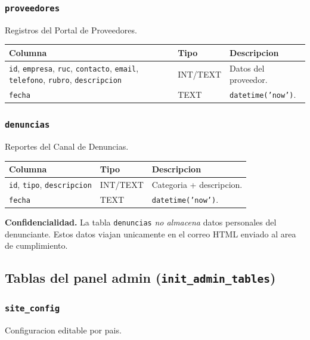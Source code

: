 \documentclass[11pt,a4paper]{article}
\begin{document}
\subsubsection{\texttt{proveedores}}
Registros del Portal de Proveedores.

\begin{longtable}{p{3cm} p{2cm} p{9cm}}
\toprule
\textbf{Columna} & \textbf{Tipo} & \textbf{Descripcion} \\
\midrule
\endhead
\texttt{id}, \texttt{empresa}, \texttt{ruc}, \texttt{contacto}, \texttt{email}, \texttt{telefono}, \texttt{rubro}, \texttt{descripcion} & INT/TEXT & Datos del proveedor. \\
\texttt{fecha} & TEXT & \texttt{datetime('now')}. \\
\bottomrule
\end{longtable}

\subsubsection{\texttt{denuncias}}
Reportes del Canal de Denuncias.

\begin{longtable}{p{3cm} p{2cm} p{9cm}}
\toprule
\textbf{Columna} & \textbf{Tipo} & \textbf{Descripcion} \\
\midrule
\endhead
\texttt{id}, \texttt{tipo}, \texttt{descripcion} & INT/TEXT & Categoria + descripcion. \\
\texttt{fecha} & TEXT & \texttt{datetime('now')}. \\
\bottomrule
\end{longtable}

\begin{infobox}
\textbf{Confidencialidad.} La tabla \texttt{denuncias} \textit{no almacena}
datos personales del denunciante. Estos datos viajan unicamente en el correo
HTML enviado al area de cumplimiento.
\end{infobox}

\subsection{Tablas del panel admin (\texttt{init\_admin\_tables})}

\subsubsection{\texttt{site\_config}}
Configuracion editable por pais.
\end{document}
